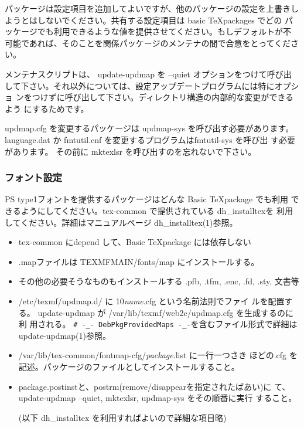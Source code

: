 \documentclass[mingoth,a4paper]{jsarticle}
\begin{document}
パッケージは設定項目を追加してよいですが、他のパッケージの設定を上書きし
ようとはしないでください。共有する設定項目は basic \TeX packages でどの
パッケージでも利用できるような値を提供させてください。もしデフォルトが不
可能であれば、そのことを関係パッケージのメンテナの間で合意をとってくださ
い。

メンテナスクリプトは、 update-updmap を --quiet オプションをつけて呼び出
して下さい。それ以外については、設定アップデートプログラムには特にオプショ
ンをつけずに呼び出して下さい。ディレクトリ構造の内部的な変更ができるよう
にするためです。

updmap.cfg を変更するパッケージは updmap-sys を呼び出す必要があります。
 language.dat か fmtutil.cnf を変更するプログラムはfmtutil-sys を呼び出
 す必要があります。
その前に mktexlsr を呼び出すのを忘れないで下さい。

\subsubsection{フォント設定}

PS type1フォントを提供するパッケージはどんな Basic \TeX package でも利用
できるようにしてください。tex-common で提供されている dh\_{}installtexを
利用してください。詳細はマニュアルページ dh\_{}installtex(1)参照。

\begin{itemize}
 \item tex-common にdepend して、Basic \TeX package には依存しない
 \item .mapファイルは TEXMFMAIN/fonts/map にインストールする。
 \item その他の必要そうなものもインストールする .pfb, .tfm, .enc, .fd,
       .sty, 文書等
 \item  /etc/texmf/updmap.d/ に 10{\it name}.cfg という名前法則でファイ
       ルを配置する。
       update-updmap が /var/lib/texmf/web2c/updmap.cfg を生成するのに利
       用される。
       \verb!# -_- DebPkgProvidedMaps -_-!を含むファイル形式で詳細は
       update-updmap(1)参照。
 \item /var/lib/tex-common/fontmap-cfg/{\it package}.list に一行一つさき
       ほどの.cfg を記述。パッケージのファイルとしてインストールすること。
 \item package.postinstと、postrm(remove/disappearを指定されたばあい)に
       て、 update-updmap --quiet, mktexlsr, updmap-sys をその順番に実行
       すること。

       (以下 dh\_{}installtex を利用すればよいので詳細な項目略)
       
\end{itemize}
\end{document}
